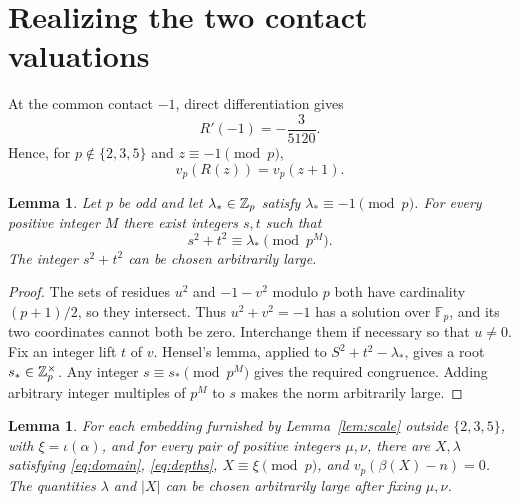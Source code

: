 \documentclass[11pt,a4paper]{article}
\newtheorem{lemma}[theorem]{Lemma}
\theoremstyle{remark}\newtheorem{remark}[theorem]{Remark}
\newcommand{\F}{\mathbb F}
\begin{document}
\section{Realizing the two contact valuations}

At the common contact \(-1\), direct differentiation gives
\begin{equation}\label{eq:derivative}
                            R'(-1)=-\frac{3}{5120}.
\end{equation}
Hence, for \(p\notin\{2,3,5\}\) and \(z\equiv-1\pmod p\),
\begin{equation}\label{eq:simple}
                         v_p(R(z))=v_p(z+1).
\end{equation}

\begin{lemma}\label{lem:norm}
Let \(p\) be odd and let \(\lambda_*\in\mathbb Z_p\) satisfy
\(\lambda_*\equiv-1\pmod p\). For every positive integer \(M\)
there exist integers \(s,t\) such that
\[
                  s^2+t^2\equiv\lambda_*\pmod{p^M}.
\]
The integer \(s^2+t^2\) can be chosen arbitrarily large.
\end{lemma}

\begin{proof}
The sets of residues \(u^2\) and \(-1-v^2\) modulo \(p\)
both have cardinality \((p+1)/2\), so they intersect.
Thus \(u^2+v^2=-1\) has a solution over \(\F_p\), and its
two coordinates cannot both be zero. Interchange them if
necessary so that \(u\ne0\). Fix an integer lift \(t\) of \(v\).
Hensel's lemma, applied to
\(S^2+t^2-\lambda_*\), gives a root \(s_*\in\mathbb Z_p^\times\).
Any integer \(s\equiv s_*\pmod{p^M}\) gives the required
congruence. Adding arbitrary integer multiples of \(p^M\)
to \(s\) makes the norm arbitrarily large.
\end{proof}

\begin{lemma}\label{lem:independent}
For each embedding furnished by Lemma~\ref{lem:scale} outside
\(\{2,3,5\}\), with \(\xi=\iota(\alpha)\), and for every pair
of positive integers \(\mu,\nu\), there are \(X,\lambda\)
satisfying \eqref{eq:domain}, \eqref{eq:depths},
\(X\equiv\xi\pmod p\), and \(v_p(\beta(X)-n)=0\).
The quantities \(\lambda\) and \(|X|\) can be chosen arbitrarily
large after fixing \(\mu,\nu\).
\end{lemma}
\end{document}
